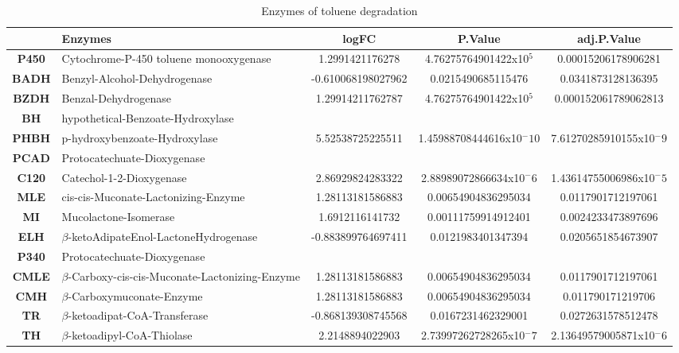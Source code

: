 \documentclass[12pt, a4paper]{report}
\begin{document}
\begin{table}[ht]
	\centering 
	\tiny
	\begin{tabular}{c p{4cm}|c|c|c}
		& \textbf{Enzymes}& \textbf{logFC} & \textbf{P.Value} & \textbf{adj.P.Value} \\
		\hline
		\textbf{P450} & Cytochrome-P-450 toluene monooxygenase & 1.2991421176278 & 4.76275764901422x10$^5$ & 0.00015206178906281 \\
		\hline
		\textbf{BADH} & Benzyl-Alcohol-Dehydrogenase & -0.610068198027962 & 0.0215490685115476 & 0.0341873128136395 \\
		\hline
		\textbf{BZDH} & Benzal-Dehydrogenase & 1.29914211762787 & 4.76275764901422x10$^5$ & 0.000152061789062813 \\
		\hline
		\textbf{BH} & hypothetical-Benzoate-Hydroxylase & & & \\
		\hline
		\textbf{PHBH} & p-hydroxybenzoate-Hydroxylase & 5.52538725225511 & 1.45988708444616x10$^-10$ & 7.61270285910155x10$^-9$  \\
		\hline
		\textbf{PCAD} & Protocatechuate-Dioxygenase & & & \\
		\hline
		\textbf{C120} & Catechol-1-2-Dioxygenase & 2.86929824283322 & 2.88989072866634x10$^-6$ & 1.43614755006986x10$^-5$ \\
		\hline
		\textbf{MLE} & cis-cis-Muconate-Lactonizing-Enzyme & 1.28113181586883 & 0.00654904836295034 & 0.0117901712197061 \\
		\hline
		\textbf{MI} & Mucolactone-Isomerase & 1.6912116141732 & 0.00111759914912401 & 0.0024233473897696 \\
		\hline
		\textbf{ELH} & $\beta$-ketoAdipateEnol-LactoneHydrogenase & -0.883899764697411 & 0.0121983401347394 & 0.0205651854673907 \\
		\hline
		\textbf{P340} & Protocatechuate-Dioxygenase & & & \\
		\hline
		\textbf{CMLE} & $\beta$-Carboxy-cis-cis-Muconate-Lactonizing-Enzyme & 1.28113181586883 & 0.00654904836295034 & 0.0117901712197061 \\
		\hline
		\textbf{CMH} & $\beta$-Carboxymuconate-Enzyme &  1.28113181586883 & 0.00654904836295034 & 0.011790171219706 \\
		\hline
		\textbf{TR} & $\beta$-ketoadipat-CoA-Transferase & -0.868139308745568 & 0.0167231462329001 & 0.0272631578512478 \\
		\hline
		\textbf{TH} & $\beta$-ketoadipyl-CoA-Thiolase & 2.2148894022903 & 2.73997262728265x10$^-7$ & 2.13649579005871x10$^-6$ \\ 
		\hline	
	\end{tabular}
	\caption{Enzymes of toluene degradation}
	\label{tolenzymes}
\end{table}
\end{document}
